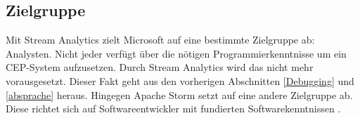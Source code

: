 \subsection{Zielgruppe}
Mit Stream Analytics zielt Microsoft auf eine bestimmte Zielgruppe ab: Analysten. Nicht jeder verfügt über die nötigen Programmierkenntnisse um ein CEP-System aufzusetzen. Durch Stream Analytics wird das nicht mehr vorausgesetzt. Dieser Fakt geht aus den vorherigen Abschnitten \ref{Debugging} und \ref{absprache} heraus. Hingegen Apache Storm setzt auf eine andere Zielgruppe ab. Diese richtet sich auf Softwareentwickler mit fundierten Softwarekenntnissen \cite{Familiar.2017}. 
